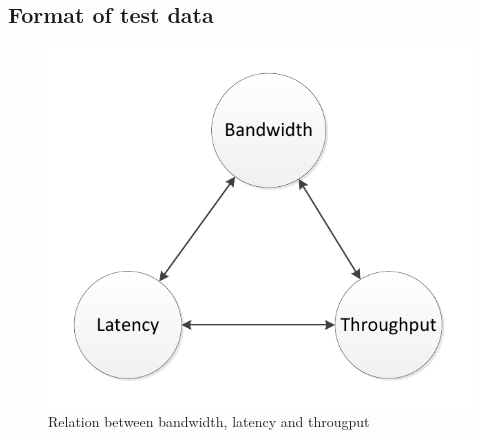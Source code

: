 \documentclass{thesis}
\begin{document}
\subsection{Format of test data}








\begin{figure}
\centering
\vspace{2.0in} 
\includegraphics{bandwidth_latency_throughput}  
\caption{Relation between bandwidth, latency and througput}
\label{Figure 1}  
\end{figure}
\end{document}
